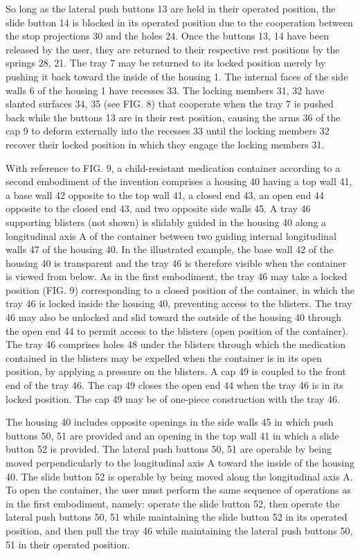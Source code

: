 \documentclass[11pt,a4paper]{article}
\begin{document}
So long as the lateral push buttons 13 are held in their operated position, the slide button 14 is blocked in its operated position due to the cooperation between the stop projections 30 and the holes 24. Once the buttons 13, 14 have been released by the user, they are returned to their respective rest positions by the springs 28, 21. The tray 7 may be returned to its locked position merely by pushing it back toward the inside of the housing 1. The internal faces of the side walls 6 of the housing 1 have recesses 33. The locking members 31, 32 have slanted surfaces 34, 35 (see FIG. 8) that cooperate when the tray 7 is pushed back while the buttons 13 are in their rest position, causing the arms 36 of the cap 9 to deform externally into the recesses 33 until the locking members 32 recover their locked position in which they engage the locking members 31.

With reference to FIG. 9, a child-resistant medication container according to a second embodiment of the invention comprises a housing 40 having a top wall 41, a base wall 42 opposite to the top wall 41, a closed end 43, an open end 44 opposite to the closed end 43, and two opposite side walls 45. A tray 46 supporting blisters (not shown) is slidably guided in the housing 40 along a longitudinal axis A of the container between two guiding internal longitudinal walls 47 of the housing 40. In the illustrated example, the base wall 42 of the housing 40 is transparent and the tray 46 is therefore visible when the container is viewed from below. As in the first embodiment, the tray 46 may take a locked position (FIG. 9) corresponding to a closed position of the container, in which the tray 46 is locked inside the housing 40, preventing access to the blisters. The tray 46 may also be unlocked and slid toward the outside of the housing 40 through the open end 44 to permit access to the blisters (open position of the container). The tray 46 comprises holes 48 under the blisters through which the medication contained in the blisters may be expelled when the container is in its open position, by applying a pressure on the blisters. A cap 49 is coupled to the front end of the tray 46. The cap 49 closes the open end 44 when the tray 46 is in its locked position. The cap 49 may be of one-piece construction with the tray 46.

The housing 40 includes opposite openings in the side walls 45 in which push buttons 50, 51 are provided and an opening in the top wall 41 in which a slide button 52 is provided. The lateral push buttons 50, 51 are operable by being moved perpendicularly to the longitudinal axis A toward the inside of the housing 40. The slide button 52 is operable by being moved along the longitudinal axis A. To open the container, the user must perform the same sequence of operations as in the first embodiment, namely: operate the slide button 52, then operate the lateral push buttons 50, 51 while maintaining the slide button 52 in its operated position, and then pull the tray 46 while maintaining the lateral push buttons 50, 51 in their operated position.
\end{document}

